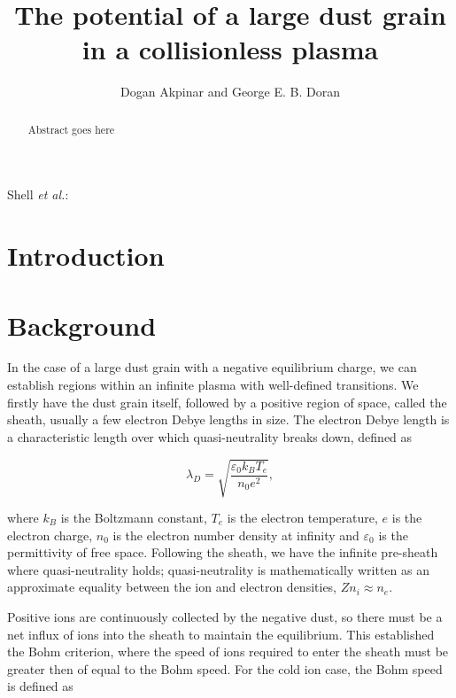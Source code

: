 \documentclass{article}
\begin{document}
\title{The potential of a large dust grain in a collisionless plasma}
\author{Dogan Akpinar and George E. B. Doran}
{Shell \MakeLowercase{\textit{et al.}}:}

\maketitle

\begin{abstract}
Abstract goes here
\end{abstract}

\section{Introduction}

\section{Background}

In the case of a large dust grain with a negative equilibrium charge, we can establish regions within an infinite plasma with well-defined
transitions. We firstly have the dust grain itself, followed
by a positive region of space, called the sheath, usually a few electron Debye lengths
in size. The electron Debye length is a characteristic length over which quasi-neutrality breaks down, 
defined as

\begin{equation}\label{eq:Debye}
\lambda_D = \sqrt{\frac{\varepsilon_{0} k_{B} T_{e}}{n_{0} e^2}},
\end{equation}

\smallskip

\noindent where $k_B$ is the Boltzmann constant, $T_e$ is the electron temperature, $e$ is the 
electron charge, $n_0$ is the electron number density at infinity and $\varepsilon_{0}$ is the
permittivity of free space. Following the sheath, we have the infinite pre-sheath where quasi-neutrality holds;
quasi-neutrality is mathematically written as an approximate equality between the ion and electron
densities, $Zn_i \approx n_e$.

\medskip

Positive ions are continuously collected by the negative dust, so there must be
a net influx of ions into the sheath to maintain the equilibrium. This established the Bohm
criterion, where the speed of ions required to enter the sheath must be 
greater then of equal to the Bohm speed. For the cold ion case, the Bohm speed is defined as
\end{document}
